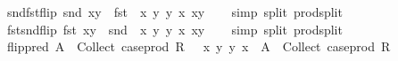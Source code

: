 \begin{isabellebody}
%
\endisadelimproof
\isanewline
{}\isamarkupfalse%
\ snd{\isacharunderscore}{\kern0pt}fst{\isacharunderscore}{\kern0pt}flip{\isacharcolon}{\kern0pt}\ {\isachardoublequoteopen}snd\ xy\ {\isacharequal}{\kern0pt}\ {\isacharparenleft}{\kern0pt}fst\ {\isasymcirc}\ {\isacharparenleft}{\kern0pt}{\isacharpercent}{\kern0pt}{\isacharparenleft}{\kern0pt}x{\isacharcomma}{\kern0pt}\ y{\isacharparenright}{\kern0pt}{\isachardot}{\kern0pt}\ {\isacharparenleft}{\kern0pt}y{\isacharcomma}{\kern0pt}\ x{\isacharparenright}{\kern0pt}{\isacharparenright}{\kern0pt}{\isacharparenright}{\kern0pt}\ xy{\isachardoublequoteclose}\isanewline
%
\isadelimproof
\ \ %
\endisadelimproof
%
\isatagproof
{}\isamarkupfalse%
\ {\isacharparenleft}{\kern0pt}simp\ split{\isacharcolon}{\kern0pt}\ prod{\isachardot}{\kern0pt}split{\isacharparenright}{\kern0pt}%
\endisatagproof
{\isafoldproof}%
%
\isadelimproof
\isanewline
%
\endisadelimproof
\isanewline
{}\isamarkupfalse%
\ fst{\isacharunderscore}{\kern0pt}snd{\isacharunderscore}{\kern0pt}flip{\isacharcolon}{\kern0pt}\ {\isachardoublequoteopen}fst\ xy\ {\isacharequal}{\kern0pt}\ {\isacharparenleft}{\kern0pt}snd\ {\isasymcirc}\ {\isacharparenleft}{\kern0pt}{\isacharpercent}{\kern0pt}{\isacharparenleft}{\kern0pt}x{\isacharcomma}{\kern0pt}\ y{\isacharparenright}{\kern0pt}{\isachardot}{\kern0pt}\ {\isacharparenleft}{\kern0pt}y{\isacharcomma}{\kern0pt}\ x{\isacharparenright}{\kern0pt}{\isacharparenright}{\kern0pt}{\isacharparenright}{\kern0pt}\ xy{\isachardoublequoteclose}\isanewline
%
\isadelimproof
\ \ %
\endisadelimproof
%
\isatagproof
{}\isamarkupfalse%
\ {\isacharparenleft}{\kern0pt}simp\ split{\isacharcolon}{\kern0pt}\ prod{\isachardot}{\kern0pt}split{\isacharparenright}{\kern0pt}%
\endisatagproof
{\isafoldproof}%
%
\isadelimproof
\isanewline
%
\endisadelimproof
\isanewline
{}\isamarkupfalse%
\ flip{\isacharunderscore}{\kern0pt}pred{\isacharcolon}{\kern0pt}\ {\isachardoublequoteopen}A\ {\isasymsubseteq}\ Collect\ {\isacharparenleft}{\kern0pt}case{\isacharunderscore}{\kern0pt}prod\ {\isacharparenleft}{\kern0pt}R\ {\isasyminverse}{\isasyminverse}{\isacharparenright}{\kern0pt}{\isacharparenright}{\kern0pt}\ {\isasymLongrightarrow}\ {\isacharparenleft}{\kern0pt}{\isacharpercent}{\kern0pt}{\isacharparenleft}{\kern0pt}x{\isacharcomma}{\kern0pt}\ y{\isacharparenright}{\kern0pt}{\isachardot}{\kern0pt}\ {\isacharparenleft}{\kern0pt}y{\isacharcomma}{\kern0pt}\ x{\isacharparenright}{\kern0pt}{\isacharparenright}{\kern0pt}\ {\isacharbackquote}{\kern0pt}\ A\ {\isasymsubseteq}\ Collect\ {\isacharparenleft}{\kern0pt}case{\isacharunderscore}{\kern0pt}prod\ R{\isacharparenright}{\kern0pt}{\isachardoublequoteclose}\isanewline

\end{isabellebody}
